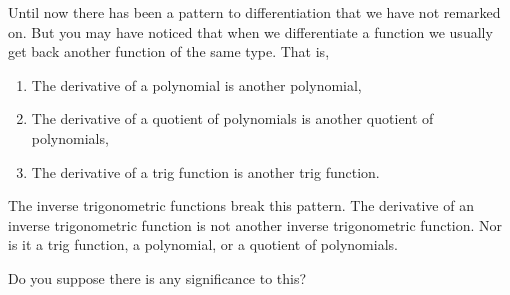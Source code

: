 
Until now there has been a pattern to differentiation that we have not
remarked on. But you may have noticed that when we differentiate a
function we usually get back another function of the same type.
That is,
\begin{enumerate}
\item The derivative of a polynomial is another polynomial,
\item The derivative of a quotient of polynomials is another quotient
  of  polynomials,
\item The derivative of a trig function is another trig
  function.
\end{enumerate}

The inverse trigonometric functions break this pattern. The derivative
of an inverse trigonometric function is not another inverse
trigonometric function. Nor is it a trig function, a polynomial, or a
quotient of polynomials.

Do you suppose there is any significance to this?









